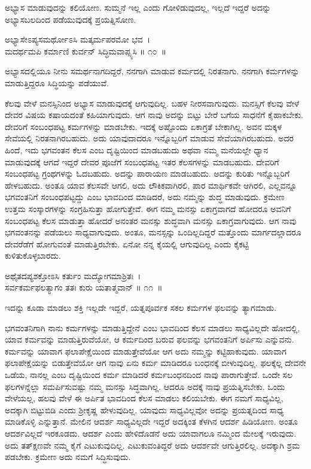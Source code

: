 ಅಭ್ಯಾಸ ಮಾಡುವುದನ್ನು ಕಲಿಯೋಣ. ಸುಮ್ಮನೆ ಇಲ್ಲ ಎಂದು ಗೋಳಿಡುವುದಲ್ಲ, ಇಲ್ಲದೆ ಇದ್ದರೆ ಅದನ್ನು ಅಭ್ಯಾಸಬಲದಿಂದ ಪಡೆಯುವುದಕ್ಕೆ ಪ್ರಯತ್ನಿಸೋಣ.

\begin{shloka}
ಅಭ್ಯಾಸೇಽಪ್ಯಸಮರ್ಥೋಽಸಿ ಮತ್ಕರ್ಮಪರಮೋ ಭವ~।\\ಮದರ್ಥಮಪಿ ಕರ್ಮಾಣಿ ಕುರ್ವನ್ ಸಿದ್ಧಿಮವಾಪ್ಸ್ಯಸಿ \hfill॥ ೧೦~॥
\end{shloka}

\begin{artha}
ಅಭ್ಯಾಸದಲ್ಲಿಯೂ ನೀನು ಸಮರ್ಥನಾಗದಿದ್ದರೆ, ನನಗಾಗಿ ಮಾಡುವ ಕರ್ಮದಲ್ಲಿ ನಿರತನಾಗು. ನನಗಾಗಿ ಕರ್ಮಗಳನ್ನು ಮಾಡುತ್ತಿದ್ದರೂ ಸಿದ್ಧಿಯನ್ನು ಪಡೆಯುವೆ.
\end{artha}

ಕೆಲವು ವೇಳೆ ಮನಸ್ಸಿನಿಂದ ಅಭ್ಯಾಸ ಮಾಡುವುದಕ್ಕೆ ಆಗುವುದಿಲ್ಲ. ಬಹಳ ನೀರಸವಾಗುವುದು. ಮನಸ್ಸಿಗೆ ಕೆಲವು ವೇಳೆ ದೇವರ ವಿಷಯ ಕಷಾಯದಂತೆ ಕಹಿಯಾಗುವುದು. ಆಗ ನಾವು ಅದನ್ನು ಬಿಟ್ಟು ಬೇರೆ ಬಗೆಯ ಸಾಧನೆಗೆ ಕೈಹಾಕಬೇಕು. ದೇವರಿಗೆ ಸಂಬಂಧಪಟ್ಟ ಕರ್ಮಗಳನ್ನು ಮಾಡಬೇಕು. ಇದಕ್ಕೆ ಅಷ್ಟೊಂದು ಏಕಾಗ್ರತೆ ಬೇಕಾಗಿಲ್ಲ. ಅವನ ಮಕ್ಕಳ ಸೇವೆಯಲ್ಲಿ ನಿರತನಾಗಿರಬಹುದು. ಅದು ಯಾವುದಾದರೂ ಇನ್ನೊಬ್ಬರಿಗೆ ಮಾಡುವ ಸೇವೆಯಾಗಿರಬಹುದು. ಅದರ ಹಿಂದೆ, ಇದು ಭಗವಂತನ ಕೆಲಸ ಎಂಬ ದೃಷ್ಟಿಯಿಂದ ಮಾಡಬಹುದು ಅಥವಾ ನಮ್ಮ ಮನೆಯಲ್ಲೇ ಧ್ಯಾನ ಮಾಡುವುದಕ್ಕೆ ಆಗದೆ ಇದ್ದರೆ ದೇವರ ಪೂಜೆಗೆ ಸಂಬಂಧಪಟ್ಟ ಇತರ ಕೆಲಸಗಳನ್ನು ಮಾಡಬಹುದು. ದೇವರಿಗೆ ಸಂಬಂಧಪಟ್ಟ ಗ್ರಂಥಗಳನ್ನು ಓದಬಹುದು. ಅದನ್ನು ಪಾರಾಯಣ ಮಾಡಬಹುದು. ಅದನ್ನು ಕುರಿತು ಇನ್ನೊಬ್ಬರಿಗೆ ಹೇಳಬಹುದು. ಅಂತೂ ಯಾವ ಕೆಲಸವೇ ಆಗಲಿ, ಅದು ಲೌಕಿಕವಾಗಿರಲಿ, ಪಾರ ಮಾರ್ಥಿಕವೇ ಆಗಿರಲಿ, ಎಲ್ಲವನ್ನೂ ಭಗವಂತನಿಗೆ ಸಂಬಂಧಪಟ್ಟದ್ದು ಎಂಬ ಭಾವದಿಂದ ಮಾಡಿದರೆ, ಅದು ನಮ್ಮನ್ನು ಶುದ್ಧ ಮಾಡುವುದು. ಕ್ರಮೇಣ ಉತ್ತಮ ಸಂಸ್ಕಾರಗಳನ್ನು ಸಂಗ್ರಹಿಸುತ್ತಾ ಹೋಗುತ್ತೇವೆ. ಈಗ ನಮ್ಮ ಮನಸ್ಸು ಏಕಾಗ್ರವಾಗದೆ ಹೋದರೂ ಅವನಿಗೆ ಸಂಬಂಧಪಟ್ಟ ಕೆಲಸ ಮಾಡುತ್ತಾ ಹೋದರೆ ಅನಂತರ ಮನಸ್ಸು ಶುದ್ಧವಾಗಿ ಮನಸ್ಸು ಏಕಾಗ್ರವಾಗುವುದು. ಆಗ ನಾವು ಭಗವಂತನನ್ನು ಪಡೆಯಲು ಸಾಧ್ಯವಾಗುವುದು. ಅಂತೂ, ಮನಸ್ಸನ್ನು ಒಂದಿಲ್ಲದಿದ್ದರೆ ಮತ್ತೊಂದು ಮಾರ್ಗದಲ್ಲಾದರೂ ದೇವರೆಡೆಗೆ ಹೋಗುವಂತೆ ಮಾಡುತ್ತಿರಬೇಕು. ಏನೋ ನನ್ನ ಕೈಯಲ್ಲಿ ಆಗುವುದಿಲ್ಲ ಎಂದು ಕೈಕಟ್ಟಿ ಕುಳಿತುಕೊಳ್ಳಬಾರದು.

\begin{shloka}
ಅಥೈತದಪ್ಯಶಕ್ತೋಽಸಿ ಕರ್ತುಂ ಮದ್ಯೋಗಮಾಶ್ರಿತಃ~।\\ಸರ್ವಕರ್ಮಫಲತ್ಯಾಗಂ ತತಃ ಕುರು ಯತಾತ್ಮವಾನ್ \hfill॥ ೧೧~॥
\end{shloka}

\begin{artha}
ಇದನ್ನು ಕೂಡಾ ಮಾಡಲು ಶಕ್ತಿ ಇಲ್ಲದೇ ಇದ್ದರೆ, ಯತ್ನಪೂರ್ವಕ ಸಕಲ ಕರ್ಮಗಳ ಫಲವನ್ನು ತ್ಯಾಗಮಾಡು.
\end{artha}

ಭಗವಂತನಿಗಾಗಿ ನಾನು ಕರ್ಮಗಳನ್ನು ಮಾಡುತ್ತಿದ್ದೇನೆ ಎಂಬ ಭಾವದಿಂದ ಕೆಲಸ ಮಾಡಲು ಸಾಧ್ಯವಿಲ್ಲದೇ ಹೋದಲ್ಲಿ, ಯಾವ ಕರ್ಮವನ್ನು ಮಾಡುತ್ತಿರುವೆಯೋ, ಆ ಕರ್ಮದಿಂದ ಬರುವ ಫಲವನ್ನು ಭಗವಂತನಿಗೆ ಅರ್ಪಿಸು ಎನ್ನುವನು. ಕರ್ಮವನ್ನು ಯಾವಾಗ ಫಲಾಪೇಕ್ಷೆಯಿಂದ ಮಾಡುತ್ತೇವೆಯೋ ಆಗ ಅದು ನಮ್ಮನ್ನು ಕಟ್ಟಿಹಾಕುವುದು. ಯಾವಾಗ ಫಲಾಪೇಕ್ಷೆಯನ್ನು ಬಿಡುತ್ತೇವೆಯೋ ಆಗ ನಾವು ಏನು ಕರ್ಮ ಮಾಡಿದರೂ ಬಂಧನಕ್ಕೆ ಬೀಳುವುದಿಲ್ಲ. ಫಲಕ್ಕೆಲ್ಲ ದೇವನೇ ಒಡೆಯ, ನಾನಲ್ಲ ಎಂಬ ದೃಷ್ಟಿಯಿಂದ ಕರ್ಮ ಮಾಡಿದರೆ ಕರ್ಮಬಂಧನದಿಂದ ನಾವು ಪಾರಾಗುತ್ತೇವೆ. ಒಂದೇ ಸಲ ಫಲಗಳನ್ನೆಲ್ಲಾ ಸಮರ್ಪಿಸುವಷ್ಟು ನಮ್ಮ ಮನಸ್ಸು ಸಿದ್ಧವಾಗಿಲ್ಲ. ಆದರೂ ಅದಕ್ಕೆ ನಾವು ಪ್ರಯತ್ನಿಸಬೇಕು. ಒಂದು ವೇಳೆಯಲ್ಲ, ಹಲವು ವೇಳೆ ಈ ಅರ್ಪಿತ ಭಾವದಿಂದ ಕೆಲಸ ಮಾಡಲು ಕಲಿಯಬೇಕು. ಈಗ ನಮಗೆ ಸಾಧ್ಯವಿಲ್ಲ, ಅದಕ್ಕಾಗಿ ಬಿಟ್ಟುಬಿಡಿ ಎಂದು ಶ‍್ರೀಕೃಷ್ಣ ಹೇಳುವುದಿಲ್ಲ. ಯಾವುದು ಸಾಧ್ಯವಿಲ್ಲವೋ ಅದನ್ನು ಪ್ರಯತ್ನದಿಂದ ಸಾಧ್ಯ ಮಾಡಿಕೊಳ್ಳಿ ಎನ್ನುತ್ತಾನೆ. ಮೇಲಿನ ಆದರ್ಶ ಸಾಧ್ಯವಿಲ್ಲದೇ ಇದ್ದರೆ ಅದಕ್ಕಿಂತ ಕೆಳಗಿನ ಆದರ್ಶ ಹಿಡಿಯೋಣ. ಅಂತೂ ಆದರ್ಶವಿಲ್ಲದೆ ಇರಕೂಡದು. ಆದರ್ಶ ಎಂದು ಹೇಳಿದೊಡನೆ ಅದು ಯಾವಾಗಲೂ ನಮ್ಮಿಂದ ಮೇಲಕ್ಕೆ ಇರುವುದು. ಅದು ತತ್​ಕ್ಷಣವೇ ನಮ್ಮ ಕೈಗೆ ಎಟುಕುವುದಿಲ್ಲ. ಎಟುಕುವಂತಿದ್ದರೆ ಅದು ಆದರ್ಶವೇ ಆಗುತ್ತಿರಲಿಲ್ಲ. ಅದಕ್ಕಾಗಿ ಶ್ರಮ ಪಡಬೇಕು. ಕ್ರಮೇಣ ಅದು ನಮಗೆ ಸಿದ್ಧಿಸುವುದು.

